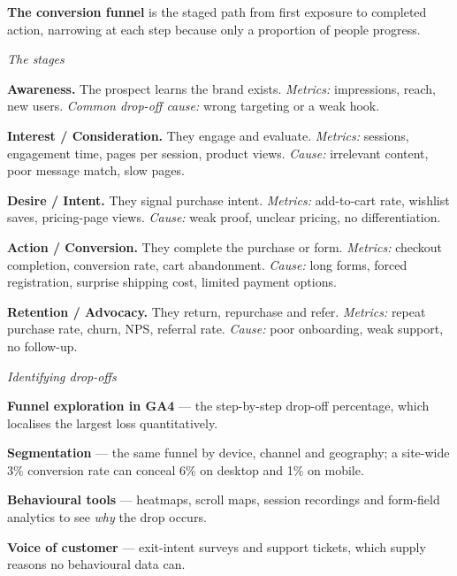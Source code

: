 \begin{qlist}
\textbf{The conversion funnel} is the staged path from first exposure to
completed action, narrowing at each step because only a proportion of people
progress.

\textit{The stages}
\begin{apts}
\item \textbf{Awareness.} The prospect learns the brand exists. \emph{Metrics:}
      impressions, reach, new users. \emph{Common drop-off cause:} wrong
      targeting or a weak hook.
\item \textbf{Interest / Consideration.} They engage and evaluate.
      \emph{Metrics:} sessions, engagement time, pages per session, product
      views. \emph{Cause:} irrelevant content, poor message match, slow pages.
\item \textbf{Desire / Intent.} They signal purchase intent. \emph{Metrics:}
      add-to-cart rate, wishlist saves, pricing-page views. \emph{Cause:} weak
      proof, unclear pricing, no differentiation.
\item \textbf{Action / Conversion.} They complete the purchase or form.
      \emph{Metrics:} checkout completion, conversion rate, cart abandonment.
      \emph{Cause:} long forms, forced registration, surprise shipping cost,
      limited payment options.
\item \textbf{Retention / Advocacy.} They return, repurchase and refer.
      \emph{Metrics:} repeat purchase rate, churn, NPS, referral rate.
      \emph{Cause:} poor onboarding, weak support, no follow-up.
\end{apts}

\textit{Identifying drop-offs}
\begin{apts}\setcounter{enumi}{5}
\item \textbf{Funnel exploration in GA4} --- the step-by-step drop-off
      percentage, which localises the largest loss quantitatively.
\item \textbf{Segmentation} --- the same funnel by device, channel and
      geography; a site-wide 3\% conversion rate can conceal 6\% on desktop and
      1\% on mobile.
\item \textbf{Behavioural tools} --- heatmaps, scroll maps, session recordings
      and form-field analytics to see \emph{why} the drop occurs.
\item \textbf{Voice of customer} --- exit-intent surveys and support tickets,
      which supply reasons no behavioural data can.
\end{apts}


\end{qlist}
